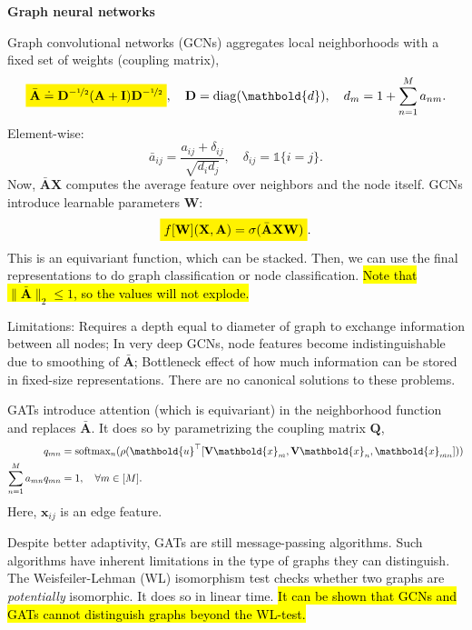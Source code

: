 \documentclass[10pt]{article}
\newenvironment{topic}[1]
{\textbf{\sffamily \footnotesize \colorbox{black}{\rlap{\textbf{\textcolor{white}{#1}}}\hspace{\linewidth}\hspace{-2\fboxsep}}}}
{}
\newenvironment{subtopic}[1]
{\begin{center}\textbf{\footnotesize \sffamily #1}\end{center}}
{}
\renewcommand{\mat}[1]{\ensuremath{\mathbf{#1}}}
\renewcommand{\vec}[1]{\ensuremath{\mathbold{#1}}}
\begin{document}
\begin{multicols*}{3}
\begin{topic}{Geometric deep learning}
\begin{subtopic}{Graph neural networks}
            Graph convolutional networks (GCNs) aggregates local neighborhoods with a fixed set of weights
            (coupling matrix), \[
                \colorbox{yellow}{$\displaystyle \bar{\mat{A}} \doteq \mat{D}^{-\nicefrac{1}{2}} (\mat{A} + \mat{I}) \mat{D}^{-\nicefrac{1}{2}}$}, \quad \mat{D} = \mathrm{diag}(\vec{d}), \quad d_m = 1 + \sum_{n=1}^{M} a_{nm}.
            \]
            Element-wise: \[
                \bar{a}_{ij} = \frac{a_{ij} + \delta_{ij}}{\sqrt{d_i d_j}}, \quad \delta_{ij} = \mathbb{1}\{ i = j \}.
            \]
            Now, $\bar{\mat{A}}\mat{X}$ computes the average feature over neighbors and the node itself.
            GCNs introduce learnable parameters $\mat{W}$: \[
                \colorbox{yellow}{$\displaystyle f[\mat{W}](\mat{X}, \mat{A}) = \sigma(\bar{\mat{A}} \mat{X} \mat{W})$}.
            \]
            This is an equivariant function, which can be stacked. Then, we can use the final representations
            to do graph classification or node classification. \hl{Note that $\| \bar{\mat{A}} \|_2 \leq
            1$, so the values will not explode.}

            Limitations: Requires a depth equal to diameter of graph to exchange information between all nodes;
            In very deep GCNs, node features become indistinguishable due to smoothing of $\bar{\mat{A}}$;
            Bottleneck effect of how much information can be stored in fixed-size representations. There are no
            canonical solutions to these problems.

            GATs introduce attention (which is equivariant) in the neighborhood function and replaces
            $\bar{\mat{A}}$. It does so by parametrizing the coupling matrix $\mat{Q}$,
            \begin{align*}
                q_{mn}                       & = \mathrm{softmax}_n ( \rho(\transpose{\vec{u}} [\mat{V}\vec{x}_m, \mat{V}\vec{x}_n, \vec{x}_{mn}]) ) \\
                \sum_{n=1}^{M} a_{mn} q_{mn} & = 1, \quad \forall m \in [M].
            \end{align*}
            Here, $\vec{x}_{ij}$ is an edge feature.

            Despite better adaptivity, GATs are still message-passing algorithms. Such algorithms have inherent
            limitations in the type of graphs they can distinguish. The Weisfeiler-Lehman (WL) isomorphism
            test checks whether two graphs are \emph{potentially} isomorphic. It does so in linear time. \hl{It can be shown that GCNs and
            GATs cannot distinguish graphs beyond the WL-test.}


\end{subtopic}
\end{topic}
\end{multicols*}
\end{document}
